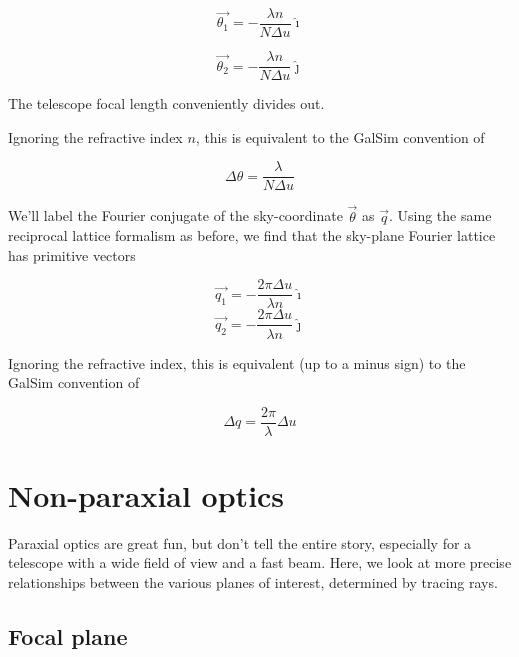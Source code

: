 \documentclass{article}
\begin{document}
\begin{equation}
    \vec{\theta_1} = -\frac{\lambda n}{N \Delta u} \hat{\imath}
    \label{eqn:theta1par}
\end{equation}

\begin{equation}
    \vec{\theta_2} = -\frac{\lambda n}{N \Delta u} \hat{\jmath}
    \label{eqn:theta2par}
\end{equation}

The telescope focal length conveniently divides out.

Ignoring the refractive index $n$, this is equivalent to the GalSim convention of

\begin{equation}
    \Delta \theta = \frac{\lambda}{N \Delta u}
\end{equation}

We'll label the Fourier conjugate of the sky-coordinate $\vec{\theta}$ as $\vec{q}$.  Using the same
reciprocal lattice formalism as before, we find that the sky-plane Fourier lattice has primitive
vectors

\begin{equation}
    \vec{q_1} = -\frac{2 \pi \Delta u}{\lambda n} \hat{\imath}
\end{equation}
\begin{equation}
    \vec{q_2} = -\frac{2 \pi \Delta u}{\lambda n} \hat{\jmath}
\end{equation}

Ignoring the refractive index, this is equivalent (up to a minus sign) to the GalSim convention of

\begin{equation}
    \Delta q = \frac{2 \pi}{\lambda} \Delta u
\end{equation}

\section{Non-paraxial optics}

Paraxial optics are great fun, but don't tell the entire story, especially for a telescope with a
wide field of view and a fast beam.  Here, we look at more precise relationships between the various
planes of interest, determined by tracing rays.

\subsection{Focal plane}
\end{document}
